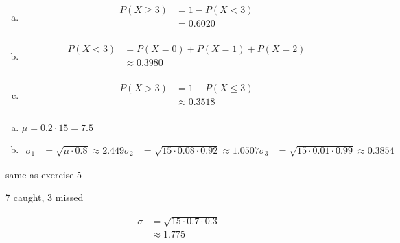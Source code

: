 \documentclass[landscape]{exam}
\begin{document}
\begin{description}
\begin{enumerate}[(a)]
        \item
          \begin{align*}
            P(X \geq 3) & = 1 - P(X < 3) \\
                        & = \boxed{ 0.6020 } \\
          \end{align*}

        \item
          \begin{align*}
            P(X < 3) & = P(X = 0) + P(X = 1) + P(X = 2) \\
                     & \approx \boxed{ 0.3980 } \\
          \end{align*}

        \item
          \begin{align*}
            P(X > 3) & = 1 - P(X \leq 3) \\
                     & \approx \boxed{ 0.3518 } \\
          \end{align*}
      \end{enumerate}
      
    \item[13.7]
      \begin{enumerate}[(a)]
        \item $\mu = 0.2 \cdot 15 = \boxed{ 7.5 }$
        \item 
          \begin{align*}
            \sigma_1 & = \sqrt{\mu \cdot 0.8} \approx \boxed{ 2.449 }
            \sigma_2 & = \sqrt{15 \cdot 0.08 \cdot 0.92} \approx \boxed{ 1.0507 }
            \sigma_3 & = \sqrt{15 \cdot 0.01 \cdot 0.99} \approx \boxed{ 0.3854 }
          \end{align*}
      \end{enumerate}

    \item[13.8]
      \begin{itemize*}
        \item same as exercise 5
        \item 7 caught, 3 missed
        \item
          \begin{align*}
            \sigma & = \sqrt{15 \cdot 0.7 \cdot 0.3} \\
                   & \approx \boxed{ 1.775 } \\
          \end{align*}
      \end{itemize*}
  \end{description}
\end{document}
